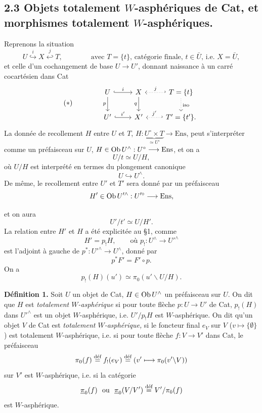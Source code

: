 \subsection*{2.3 Objets totalement $W$-asphériques de \textnormal{Cat}, et morphismes totalement $W$-asphériques.}

Reprenons la situation
\[
U\overset{i}{\hookrightarrow}X\overset{j}{\hookleftarrow}T,\qquad\qquad\text{avec }T=\{t\}\text{, catégorie finale, }t\in\bar U\text{, i.e. }X=\bar U,
\]
et celle d’un cochangement de base $U\longrightarrow U'$, donnant naissance à un carré cocartésien dans Cat
\[
(*)\qquad\qquad
\begin{tikzcd}
U \arrow[r, hook, "i"] \arrow[d, "p"'] & X \arrow[d, "q"'] & T=\{t\} \arrow[l, hook', dotted, "j"'] \arrow[d, dotted, "\mathrm{iso}"] \\
U' \arrow[r, hook, "i'"] & X' & T'=\{t'\}. \arrow[l, hook', dotted, "j'"']
\end{tikzcd}
\]
La donnée de recollement $H$ entre $U$ et $T$, $H:\underbrace{U^\circ\times T}_{\simeq U^\circ}\longrightarrow\mathrm{Ens}$, peut s’interpréter comme un préfaisceau sur $U$, $H\in\Ob U^\wedge:U^\circ\longrightarrow\mathrm{Ens}$,
et on a
\[
U/t\simeq U/H,
\]
où $U/H$ est interprété en termes du plongement canonique
\[
U\hookrightarrow U^\wedge.
\]
De même, le recollement entre $U'$ et $T'$ sera donné par un préfaisceau
\[
H'\in\Ob U^{\prime\wedge}:U^{\prime\circ}\longrightarrow\mathrm{Ens},
\]

et on aura
\[ U'/t' \simeq U/H'. \]
La relation entre $H'$ et $H$ a été explicitée au §1, comme
\[ H' = p_!H, \qquad \text{où } p_! : U^{\wedge} \longrightarrow U'^{\wedge} \]
est l'adjoint à gauche de $p^* : U'^{\wedge} \longrightarrow U^{\wedge}$, donné par
\[ p^*F' = F' \circ p. \]
On a
\[ p_!(H)(u') \simeq \pi_0(u'\backslash U/H). \]

\textbf{Définition 1.}  Soit $U$ un objet de Cat, $H \in \Ob U^{\wedge}$ un préfaisceau sur $U$. On dit que $H$ est \textit{totalement $W$-asphérique} si pour toute flèche $p : U \longrightarrow U'$ de Cat, $p_!(H)$ dans $U'^{\wedge}$ est un objet $W$-asphérique, i.e. $U'/p_!H$ est $W$-asphérique.  On dit qu'un objet $V$ de  Cat est \textit{totalement $W$-asphérique,} si le foncteur final $e_V$ sur $V$ ($v \longmapsto \{\emptyset\}$) est totalement $W$-asphérique, i.e. si pour toute flèche $f : V \longrightarrow V'$ dans Cat, le préfaisceau
\[ \pi_0(f) \defeq f_!(e_V) \defeq (v' \longmapsto \pi_0(v'\backslash V)) \]
sur $V'$ est $W$-asphérique, i.e. si la catégorie
\[ \upi_0(f) \ \text{ ou } \ \upi_0(V/V') \defeq V'/\pi_0(f) \]
est $W$-asphérique.


